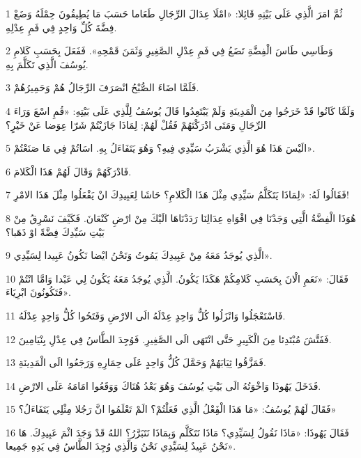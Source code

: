 \par 1 ثُمَّ امَرَ الَّذِي عَلَى بَيْتِهِ قَائِلا: «امْلَا عِدَالَ الرِّجَالِ طَعَاما حَسَبَ مَا يُطِيقُونَ حِمْلَهُ وَضَعْ فِضَّةَ كُلِّ وَاحِدٍ فِي فَمِ عِدْلِهِ.
\par 2 وَطَاسِي طَاسَ الْفِضَّةِ تَضَعُ فِي فَمِ عِدْلِ الصَّغِيرِ وَثَمَنَ قَمْحِهِ». فَفَعَلَ بِحَسَبِ كَلامِ يُوسُفَ الَّذِي تَكَلَّمَ بِهِ.
\par 3 فَلَمَّا اضَاءَ الصُّبْحُ انْصَرَفَ الرِّجَالُ هُمْ وَحَمِيرُهُمْ.
\par 4 وَلَمَّا كَانُوا قَدْ خَرَجُوا مِنَ الْمَدِينَةِ وَلَمْ يَبْتَعِدُوا قَالَ يُوسُفُ لِلَّذِي عَلَى بَيْتِهِ: «قُمِ اسْعَ وَرَاءَ الرِّجَالِ وَمَتَى ادْرَكْتَهُمْ فَقُلْ لَهُمْ: لِمَاذَا جَازَيْتُمْ شَرّا عِوَضا عَنْ خَيْرٍ؟
\par 5 الَيْسَ هَذَا هُوَ الَّذِي يَشْرَبُ سَيِّدِي فِيهِ؟ وَهُوَ يَتَفَاءَلُ بِهِ. اسَاتُمْ فِي مَا صَنَعْتُمْ».
\par 6 فَادْرَكَهُمْ وَقَالَ لَهُمْ هَذَا الْكَلامَ.
\par 7 فَقَالُوا لَهُ: «لِمَاذَا يَتَكَلَّمُ سَيِّدِي مِثْلَ هَذَا الْكَلامِ؟ حَاشَا لِعَبِيدِكَ انْ يَفْعَلُوا مِثْلَ هَذَا الامْرِ!
\par 8 هُوَذَا الْفِضَّةُ الَّتِي وَجَدْنَا فِي افْوَاهِ عِدَالِنَا رَدَدْنَاهَا الَيْكَ مِنْ ارْضِ كَنْعَانَ. فَكَيْفَ نَسْرِقُ مِنْ بَيْتِ سَيِّدِكَ فِضَّةً اوْ ذَهَبا؟
\par 9 الَّذِي يُوجَدُ مَعَهُ مِنْ عَبِيدِكَ يَمُوتُ وَنَحْنُ ايْضا نَكُونُ عَبِيدا لِسَيِّدِي».
\par 10 فَقَالَ: «نَعَمِ الْانَ بِحَسَبِ كَلامِكُمْ هَكَذَا يَكُونُ. الَّذِي يُوجَدُ مَعَهُ يَكُونُ لِي عَبْدا وَامَّا انْتُمْ فَتَكُونُونَ ابْرِيَاءَ».
\par 11 فَاسْتَعْجَلُوا وَانْزَلُوا كُلُّ وَاحِدٍ عِدْلَهُ الَى الارْضِ وَفَتَحُوا كُلُّ وَاحِدٍ عِدْلَهُ.
\par 12 فَفَتَّشَ مُبْتَدِئا مِنَ الْكَبِيرِ حَتَّى انْتَهَى الَى الصَّغِيرِ. فَوُجِدَ الطَّاسُ فِي عِدْلِ بِنْيَامِينَ.
\par 13 فَمَزَّقُوا ثِيَابَهُمْ وَحَمَّلَ كُلُّ وَاحِدٍ عَلَى حِمَارِهِ وَرَجَعُوا الَى الْمَدِينَةِ.
\par 14 فَدَخَلَ يَهُوذَا وَاخْوَتُهُ الَى بَيْتِ يُوسُفَ وَهُوَ بَعْدُ هُنَاكَ وَوَقَعُوا امَامَهُ عَلَى الارْضِ.
\par 15 فَقَالَ لَهُمْ يُوسُفُ: «مَا هَذَا الْفَِعْلُ الَّذِي فَعَلْتُمْ؟ الَمْ تَعْلَمُوا انَّ رَجُلا مِثْلِي يَتَفَاءَلُ؟»
\par 16 فَقَالَ يَهُوذَا: «مَاذَا نَقُولُ لِسَيِّدِي؟ مَاذَا نَتَكَلَّم وَبِمَاذَا نَتَبَرَّرُ؟ اللهُ قَدْ وَجَدَ اثْمَ عَبِيدِكَ. هَا نَحْنُ عَبِيدٌ لِسَيِّدِي نَحْنُ وَالَّذِي وُجِدَ الطَّاسُ فِي يَدِهِ جَمِيعا».
